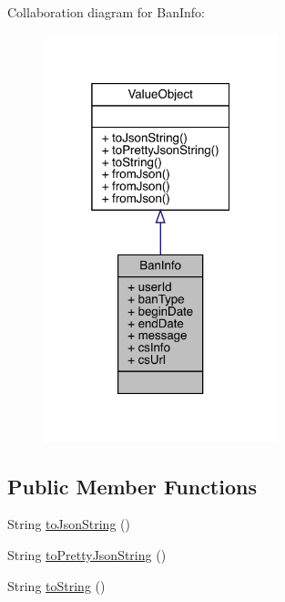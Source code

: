 Collaboration diagram for Ban\+Info\+:\nopagebreak
\begin{figure}[H]
\begin{center}
\leavevmode
\includegraphics[width=193pt]{classcom_1_1toast_1_1android_1_1gamebase_1_1auth_1_1data_1_1_ban_info__coll__graph}
\end{center}
\end{figure}
\subsection*{Public Member Functions}
\begin{DoxyCompactItemize}
\item 
String \hyperlink{classcom_1_1toast_1_1android_1_1gamebase_1_1base_1_1_value_object_a58acf6402880e9769d79d8667581fa6a}{to\+Json\+String} ()
\item 
String \hyperlink{classcom_1_1toast_1_1android_1_1gamebase_1_1base_1_1_value_object_a054431f3d988a22295cfc8b784ff2637}{to\+Pretty\+Json\+String} ()
\item 
String \hyperlink{classcom_1_1toast_1_1android_1_1gamebase_1_1base_1_1_value_object_ad146fa8579a5f8a876c4688cc5a68520}{to\+String} ()
\end{DoxyCompactItemize}
